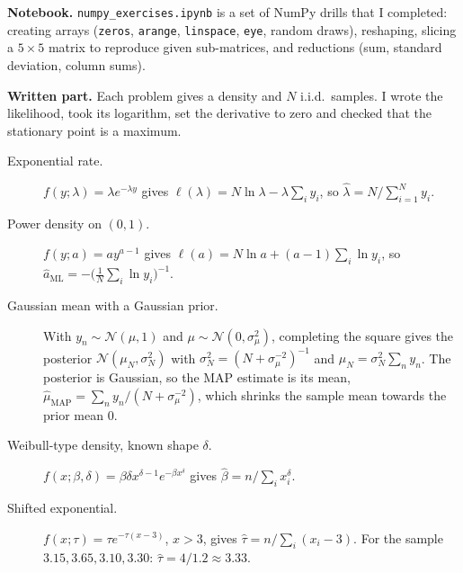 


\textbf{Notebook.} \texttt{numpy\_exercises.ipynb} is a set of NumPy drills that I completed: creating arrays (\texttt{zeros}, \texttt{arange}, \texttt{linspace}, \texttt{eye}, random draws), reshaping, slicing a $5\times5$ matrix to reproduce given sub-matrices, and reductions (sum, standard deviation, column sums).

\textbf{Written part.} Each problem gives a density and $N$ i.i.d.\ samples. I wrote the likelihood, took its logarithm, set the derivative to zero and checked that the stationary point is a maximum.
\begin{description}
  \item[Exponential rate.] $f(y;\lambda)=\lambda e^{-\lambda y}$ gives $\ell(\lambda)=N\ln\lambda-\lambda\sum_i y_i$, so $\hat\lambda=N/\sum_{i=1}^N y_i$.
  \item[Power density on $(0,1)$.] $f(y;a)=a y^{a-1}$ gives $\ell(a)=N\ln a+(a-1)\sum_i\ln y_i$, so $\hat a_{\mathrm{ML}}=-\big(\tfrac1N\sum_i\ln y_i\big)^{-1}$.
  \item[Gaussian mean with a Gaussian prior.] With $y_n\sim\mathcal N(\mu,1)$ and $\mu\sim\mathcal N(0,\sigma_\mu^2)$, completing the square gives the posterior $\mathcal N(\mu_N,\sigma_N^2)$ with $\sigma_N^2=(N+\sigma_\mu^{-2})^{-1}$ and $\mu_N=\sigma_N^2\sum_n y_n$. The posterior is Gaussian, so the MAP estimate is its mean, $\hat\mu_{\mathrm{MAP}}=\sum_n y_n/(N+\sigma_\mu^{-2})$, which shrinks the sample mean towards the prior mean $0$.
  \item[Weibull-type density, known shape $\delta$.] $f(x;\beta,\delta)=\beta\delta x^{\delta-1}e^{-\beta x^\delta}$ gives $\hat\beta=n/\sum_i x_i^\delta$.
  \item[Shifted exponential.] $f(x;\tau)=\tau e^{-\tau(x-3)}$, $x>3$, gives $\hat\tau=n/\sum_i(x_i-3)$. For the sample $3.15, 3.65, 3.10, 3.30$: $\hat\tau=4/1.2\approx3.33$.
\end{description}

